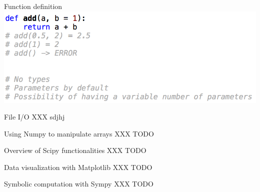 \documentclass[11pt,unknownkeysallowed,usenames,dvipsnames]{beamer}
\begin{document}
%    
\begin{frame}{Function definition}
    \includegraphics[width=\linewidth]{code-functions}
\end{frame}
   

\begin{frame}{File I/O}
	XXX sdjhj
\end{frame}


\begin{frame}{Using Numpy to manipulate arrays}
	XXX TODO
\end{frame}


\begin{frame}{Overview of Scipy functionalities}
    XXX TODO
\end{frame}


\begin{frame}{Data visualization with Matplotlib}
    XXX TODO
\end{frame}


\begin{frame}{Symbolic computation with Sympy}
    XXX TODO
\end{frame}
\end{document}
